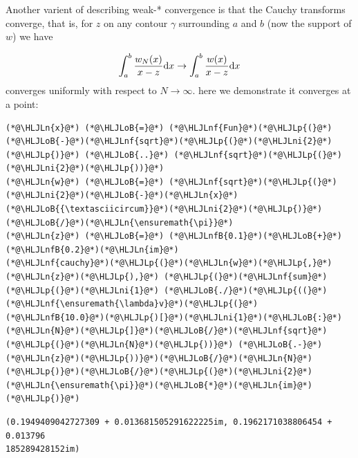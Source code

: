 \documentclass[12pt,a4paper]{article}
\newcommand{\HLJLn}[1]{#1}
\newcommand{\HLJLnf}[1]{\textcolor[RGB]{66,102,213}{#1}}
\newcommand{\HLJLnfB}[1]{\textcolor[RGB]{59,151,46}{#1}}
\newcommand{\HLJLni}[1]{\textcolor[RGB]{59,151,46}{#1}}
\newcommand{\HLJLoB}[1]{\textcolor[RGB]{102,102,102}{\textbf{#1}}}
\newcommand{\HLJLp}[1]{#1}
\def\D{ {\rm d} }
\def\dx{\D x}
\begin{document}
Another varient of describing weak-* convergence is that the Cauchy transforms converge,  that is, for $z$ on any  contour $\gamma$ surrounding $a$ and $b$ (now the support of $w$) we have

\[
\int_a^b {w_N(x) \over x - z} \dx \rightarrow \int_a^b {w(x) \over x - z} \dx
\]
converges uniformly with respect to $N \rightarrow \infty$. here we demonstrate it converges at a point:


\begin{lstlisting}
(*@\HLJLn{x}@*) (*@\HLJLoB{=}@*) (*@\HLJLnf{Fun}@*)(*@\HLJLp{(}@*)(*@\HLJLoB{-}@*)(*@\HLJLnf{sqrt}@*)(*@\HLJLp{(}@*)(*@\HLJLni{2}@*)(*@\HLJLp{)}@*) (*@\HLJLoB{..}@*) (*@\HLJLnf{sqrt}@*)(*@\HLJLp{(}@*)(*@\HLJLni{2}@*)(*@\HLJLp{))}@*)
(*@\HLJLn{w}@*) (*@\HLJLoB{=}@*) (*@\HLJLnf{sqrt}@*)(*@\HLJLp{(}@*)(*@\HLJLni{2}@*)(*@\HLJLoB{-}@*)(*@\HLJLn{x}@*)(*@\HLJLoB{{\textasciicircum}}@*)(*@\HLJLni{2}@*)(*@\HLJLp{)}@*)(*@\HLJLoB{/}@*)(*@\HLJLn{\ensuremath{\pi}}@*)
(*@\HLJLn{z}@*) (*@\HLJLoB{=}@*) (*@\HLJLnfB{0.1}@*)(*@\HLJLoB{+}@*)(*@\HLJLnfB{0.2}@*)(*@\HLJLn{im}@*)
(*@\HLJLnf{cauchy}@*)(*@\HLJLp{(}@*)(*@\HLJLn{w}@*)(*@\HLJLp{,}@*) (*@\HLJLn{z}@*)(*@\HLJLp{),}@*) (*@\HLJLp{(}@*)(*@\HLJLnf{sum}@*)(*@\HLJLp{(}@*)(*@\HLJLni{1}@*) (*@\HLJLoB{./}@*)(*@\HLJLp{((}@*)(*@\HLJLnf{\ensuremath{\lambda}v}@*)(*@\HLJLp{(}@*)(*@\HLJLnfB{10.0}@*)(*@\HLJLp{)[}@*)(*@\HLJLni{1}@*)(*@\HLJLoB{:}@*)(*@\HLJLn{N}@*)(*@\HLJLp{]}@*)(*@\HLJLoB{/}@*)(*@\HLJLnf{sqrt}@*)(*@\HLJLp{(}@*)(*@\HLJLn{N}@*)(*@\HLJLp{))}@*) (*@\HLJLoB{.-}@*) (*@\HLJLn{z}@*)(*@\HLJLp{))}@*)(*@\HLJLoB{/}@*)(*@\HLJLn{N}@*)(*@\HLJLp{)}@*)(*@\HLJLoB{/}@*)(*@\HLJLp{(}@*)(*@\HLJLni{2}@*)(*@\HLJLn{\ensuremath{\pi}}@*)(*@\HLJLoB{*}@*)(*@\HLJLn{im}@*)(*@\HLJLp{)}@*)
\end{lstlisting}

\begin{lstlisting}
(0.1949409042727309 + 0.013681505291622225im, 0.1962171038806454 + 0.013796
185289428152im)
\end{lstlisting}
\end{document}

